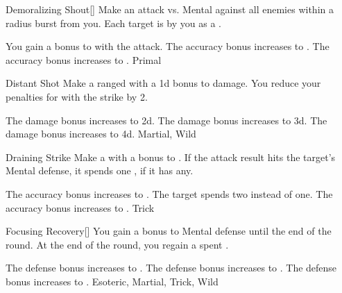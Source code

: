 \lowercase{\hypertarget{maneuver:Demoralizing Shout}{}}\label{maneuver:Demoralizing Shout}
\begin{apability}{\hypertarget{maneuver:Demoralizing Shout}{Demoralizing Shout}}[]
Make an attack vs. Mental against all enemies within a \arealarge radius burst from you.
\hit Each target is  by you as a .

\rankline
{} You gain a  bonus to  with the attack.
 The accuracy bonus increases to .
 The accuracy bonus increases to .
 Primal
\end{apability}
\vspace{0.25em}



\lowercase{\hypertarget{maneuver:Distant Shot}{}}\label{maneuver:Distant Shot}
\begin{apability}{\hypertarget{maneuver:Distant Shot}{Distant Shot}}
Make a ranged  with a \plus1d bonus to damage.
You reduce your penalties for  with the strike by 2.

\rankline
{} The damage bonus increases to \plus2d.
 The damage bonus increases to \plus3d.
 The damage bonus increases to \plus4d.
 Martial, Wild
\end{apability}
\vspace{0.25em}



\lowercase{\hypertarget{maneuver:Draining Strike}{}}\label{maneuver:Draining Strike}
\begin{apability}{\hypertarget{maneuver:Draining Strike}{Draining Strike}}
Make a  with a  bonus to .
If the attack result hits the target's Mental defense,
it spends one , if it has any.

\rankline
{} The accuracy bonus increases to .
 The target spends two  instead of one.
 The accuracy bonus increases to .
 Trick
\end{apability}
\vspace{0.25em}



\lowercase{\hypertarget{maneuver:Focusing Recovery}{}}\label{maneuver:Focusing Recovery}
\begin{freeability}{\hypertarget{maneuver:Focusing Recovery}{Focusing Recovery}}[]
You gain a  bonus to Mental defense until the end of the round.
At the end of the round, you regain a spent .

\rankline
{} The defense bonus increases to .
 The defense bonus increases to .
 The defense bonus increases to .
 Esoteric, Martial, Trick, Wild
\end{freeability}
\vspace{0.25em}



